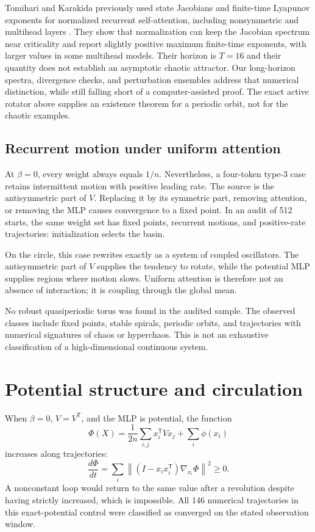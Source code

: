 \documentclass[11pt,a4paper]{article}
\theoremstyle{definition}
\newcommand{\T}{\mathsf T}
\newcommand{\norm}[1]{\left\lVert #1\right\rVert}
\begin{document}
Tomihari and Karakida previously used state Jacobians and finite-time Lyapunov
exponents for normalized recurrent self-attention, including nonsymmetric and
multihead layers \cite{tomihari2025recurrent}.  They show that normalization can keep
the Jacobian spectrum near criticality and report slightly positive maximum
finite-time exponents, with larger values in some multihead models.  Their horizon is
$T=16$ and their quantity does not establish an asymptotic chaotic attractor.  Our
long-horizon spectra, divergence checks, and perturbation ensembles address that
numerical distinction, while still falling short of a computer-assisted proof.  The
exact active rotator above supplies an existence theorem for a periodic orbit, not for
the chaotic examples.

\subsection{Recurrent motion under uniform attention}

At $\beta=0$, every weight always equals $1/n$. Nevertheless, a four-token type-3
case retains intermittent motion with positive leading rate. The source is
the antisymmetric part of $V$. Replacing it by its symmetric part, removing attention,
or removing the MLP causes convergence to a fixed point. In an audit of 512 starts,
the same weight set has fixed points, recurrent motions, and positive-rate trajectories:
initialization selects the basin.

On the circle, this case rewrites exactly as a system of coupled oscillators. The
antisymmetric part of $V$ supplies the tendency to rotate, while the potential MLP
supplies regions where motion slows. Uniform attention is therefore not an absence of
interaction; it is coupling through the global mean.

No robust quasiperiodic torus was found in the audited sample. The observed classes include fixed points,
stable spirals, periodic orbits, and trajectories with numerical signatures of chaos
or hyperchaos.  This is not an exhaustive classification of a high-dimensional
continuous system.

\section{Potential structure and circulation}
\label{sec:energy}

When $\beta=0$, $V=V^{\T}$, and the MLP is potential, the function
\begin{equation}
 \Phi(X)=\frac{1}{2n}\sum_{i,j}x_i^{\T}Vx_j+\sum_i\phi(x_i)\label{eq:global-potential}
\end{equation}
increases along trajectories:
\[
 \frac{d\Phi}{dt}=\sum_i\norm{(I-x_ix_i^{\T})\nabla_{x_i}\Phi}^2\ge0.
\]
A nonconstant loop would return to the same value after a revolution despite having
strictly increased, which is impossible. All 146 numerical trajectories in this
exact-potential control were classified as converged on the stated observation
window.
\end{document}
